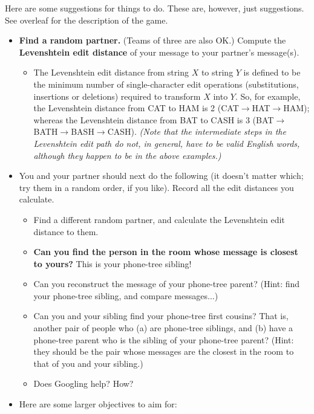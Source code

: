 \documentclass[10pt,letterpaper,english]{article}
\begin{document}
{Here are some suggestions for things to do.
These are, however, just suggestions.
See overleaf for the description of the game.

\begin{itemize}
\item {\bf Find a random partner.} (Teams of three are also OK.) Compute the {\bf Levenshtein edit distance} of your message to your partner's message(s).
\begin{itemize}
\item The Levenshtein edit distance from string $X$ to string $Y$ is defined to be
  the minimum number of single-character edit operations (substitutions, insertions or deletions) required to transform $X$ into $Y$.
  So, for example, the Levenshtein distance from CAT to HAM is 2 (CAT$\to$HAT$\to$HAM); whereas the Levenshtein distance from BAT to CASH is 3 (BAT$\to$BATH$\to$BASH$\to$CASH).
  {\em (Note that the intermediate steps in the Levenshtein edit path do not, in general, have to be valid English words, although they happen to be in the above examples.)}
\end{itemize}
\item You and your partner should next do the following (it doesn't matter which; try them in a random order, if you like). Record all the edit distances you calculate.
  \begin{itemize}
  \item Find a different random partner, and calculate the Levenshtein edit distance to them.
  \item {\bf Can you find the person in the room whose message is closest to yours?} This is your phone-tree sibling!
  \item Can you reconstruct the message of your phone-tree parent? (Hint: find your phone-tree sibling, and compare messages...)
  \item Can you and your sibling find your phone-tree first cousins? That is, another pair of people who (a) are phone-tree siblings, and (b) have a phone-tree parent who is the sibling of your phone-tree parent? (Hint: they should be the pair whose messages are the closest in the room to that of you and your sibling.)
  \item Does Googling help? How?
  \end{itemize}
\item Here are some larger objectives to aim for:

\end{itemize}}
\end{document}
